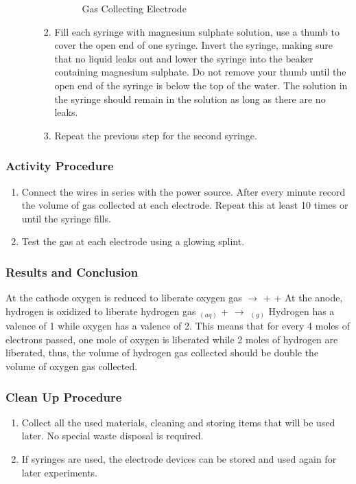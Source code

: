 \begin{enumerate}
\begin{enumerate}
\begin{enumerate}
{\begin{figure}[h]
\begin{center}
\def\svgwidth{200pt}

\caption{Gas Collecting Electrode}
\label{fig:gas collecting electrode}
\end{center}
\end{figure}}

\item{Fill each syringe with magnesium sulphate solution, use a thumb to cover the open end of one syringe. Invert the syringe, making sure that no liquid leaks out and lower the syringe into the beaker containing magnesium sulphate. Do not remove your thumb until the open end of the syringe is below the top of the water. The solution in the syringe should remain in the solution as long as there are no leaks.}
\item{Repeat the previous step for the second syringe.}
\end{enumerate}
\end{enumerate}
\end{enumerate}

\subsubsection*{Activity Procedure}
\begin{enumerate}
\item{Connect the wires in series with the power source. After every minute record the volume of gas collected at each electrode. Repeat this at least 10 times or until the syringe fills.}
\item{Test the gas at each electrode using a glowing splint.}
\end{enumerate}

\subsubsection*{Results and Conclusion}
At the cathode oxygen is reduced to liberate oxygen gas
 $\longrightarrow$  +  + 
At the anode, hydrogen is oxidized to liberate hydrogen gas
$_{(aq)}$ +  $\longrightarrow$ $_{(g)}$
Hydrogen has a valence of 1 while oxygen has a valence of 2. This means that for every 4 moles of electrons passed, one mole of oxygen is liberated while 2 moles of hydrogen are liberated, thus, the volume of hydrogen gas collected should be double the volume of oxygen gas collected.

\subsubsection*{Clean Up Procedure}
\begin{enumerate}
\item{Collect all the used materials, cleaning and storing items that will be used later. No special waste disposal is required.}
\item{If syringes are used, the electrode devices can be stored and used again for later experiments.}
\end{enumerate}

